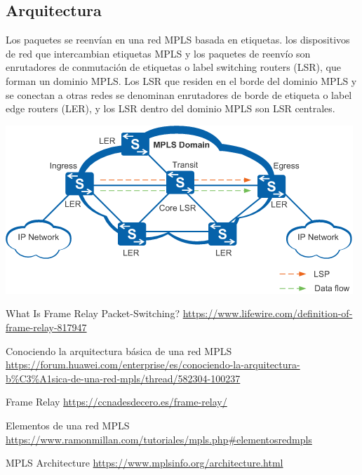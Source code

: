 \subsection*{Arquitectura}
Los paquetes se reenvían en una red MPLS basada en etiquetas. los dispositivos de red que intercambian etiquetas MPLS y los paquetes de reenvío son enrutadores de conmutación de etiquetas o label switching routers (LSR), que forman un dominio MPLS. Los LSR que residen en el borde del dominio MPLS y se conectan a otras redes se denominan enrutadores de borde de etiqueta o label edge routers (LER), y los LSR dentro del dominio MPLS son LSR centrales.

\begin{center}
\includegraphics[scale=0.66]{Imagenes/MPLS.png}
\end{center}


\begin{thebibliography}{9}

What Is Frame Relay Packet-Switching? \href{https://www.lifewire.com/definition-of-frame-relay-817947}{https://www.lifewire.com/definition-of-frame-relay-817947}



Conociendo la arquitectura básica de una red MPLS \href{https://forum.huawei.com/enterprise/es/conociendo-la-arquitectura-b\%C3\%A1sica-de-una-red-mpls/thread/582304-100237}{https://forum.huawei.com/enterprise/es/conociendo-la-arquitectura-b\%C3\%A1sica-de-una-red-mpls/thread/582304-100237}

Frame Relay \href{https://ccnadesdecero.es/frame-relay/}{https://ccnadesdecero.es/frame-relay/}

Elementos de una red MPLS \href{https://www.ramonmillan.com/tutoriales/mpls.php{\#}elementosredmpls}{https://www.ramonmillan.com/tutoriales/mpls.php{\#}elementosredmpls}

MPLS Architecture \href{ https://www.mplsinfo.org/architecture.html}{ https://www.mplsinfo.org/architecture.html}

\end{thebibliography}

